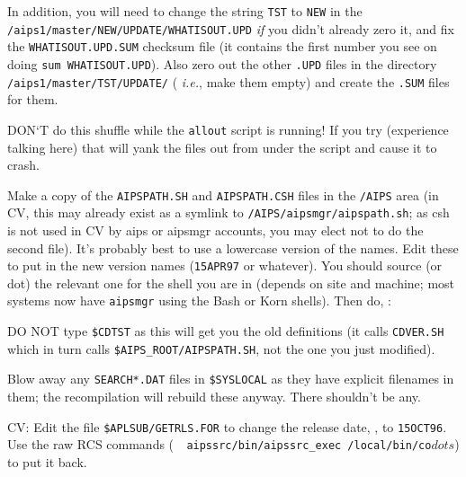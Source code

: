 \item{} In addition, you will need to change the string {\tt TST} to
        {\tt NEW} in the {\tt
        /aips1/master/NEW/UP\-DATE/WHAT\-IS\-OUT.UPD} {\it if\/} you
        didn't already zero it, and fix the {\tt WHATISOUT.UPD.SUM}
        checksum file (it contains the first number you see on doing
        {\tt sum WHATISOUT.UPD}).  Also zero out the other {\tt *.UPD}
        files in the directory {\tt /aips1/mas\-ter/TST/UP\-DATE/} ({\it
        i.e.\/}, make them empty) and create the {\tt .SUM} files for
        them.

\item{} DON`T do this shuffle while the {\tt allout} script is running!
        If you try (experience talking here) that will yank the files
        out from under the script and cause it to crash.


\noindent Make a copy of the {\tt AIPSPATH.SH} and {\tt AIPSPATH.CSH}
files in the {\tt /AIPS} area (in CV, this may already exist as a
symlink to {\tt /AIPS/aipsmgr/aipspath.sh}; as csh is not used in CV by
aips or aipsmgr accounts, you may elect not to do the second file).
It's probably best to use a lowercase version of the names.  Edit these
to put in the new version names ({\tt 15APR97} or whatever).  You should
source (or dot) the relevant one for the shell you are in (depends on
site and machine; most systems now have {\tt aipsmgr} using the Bash or
Korn shells).  Then do, \eg:\medskip

\medskip

\noindent DO NOT type {\tt \$CDTST} as this will get you the old
definitions (it calls {\tt CDVER.SH} which in turn calls
{\tt\$AIPS\_ROOT/AIPSPATH.SH}, not the one you just modified).

Blow away any {\tt SEARCH*.DAT} files in {\tt \$SYSLOCAL} as they have
explicit filenames in them; the recompilation will rebuild these anyway.
There shouldn't be any.

\item{CV:} Edit the file {\tt \$APLSUB/GETRLS.FOR} to change the release
           date, \eg, to {\tt 15OCT96}.  Use the raw RCS commands ({\tt
           ~{}aipssrc/bin/aipssrc\_exec /local/bin/co}$dots$) to put it
           back.

